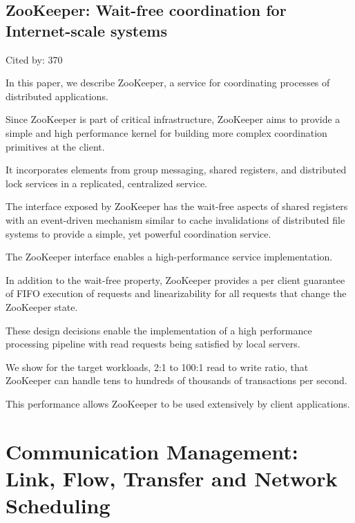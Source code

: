 \documentclass[a4paper,11pt]{article}
\begin{document}
\subsection*{ZooKeeper: Wait-free coordination for Internet-scale systems}
{\color{cyan} {\color{magenta} Cited by: 370}

In this paper, 
we describe 
{\color{black} ZooKeeper\cite{zookeeper}}, 
a service for coordinating processes of distributed applications. 

Since ZooKeeper is part of critical infrastructure, 
ZooKeeper aims to provide 
a simple and high performance kernel 
for building more complex coordination primitives at the client. 

It incorporates elements from 
group messaging, shared registers, and distributed lock services 
in a replicated, centralized service. 

The interface exposed by ZooKeeper has the wait-free aspects of shared registers with
an event-driven mechanism similar to cache invalidations of distributed file systems 
to provide a simple, yet powerful coordination service.

The ZooKeeper interface enables a high-performance service implementation. 

In addition to the wait-free property, 
ZooKeeper provides a per client guarantee of FIFO execution of requests and linearizability for all requests
that change the ZooKeeper state. 

These design decisions 
enable the implementation of 
a high performance processing pipeline with read requests being satisfied by local servers. 

We show for the target workloads, 2:1 to 100:1 read to write ratio, that 
ZooKeeper can handle tens to hundreds of thousands of transactions per second.

This performance allows ZooKeeper to be used extensively by client applications.	

}

\section{Communication Management: Link, Flow, Transfer and Network Scheduling}
\end{document}
